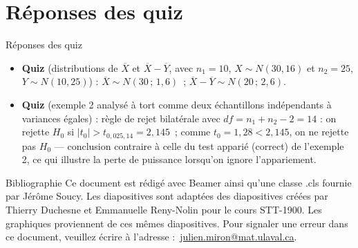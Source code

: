 \documentclass{BeamerTemplate}
\begin{document}
\section{Réponses des quiz}

\begin{frame}[t]{Réponses des quiz}
\footnotesize
\begin{itemize}
\item \textbf{Quiz} (distributions de $\overline X$ et $\overline X - \overline Y$, avec $n_1=10$,
$X\sim N(30,16)$ et $n_2=25$, $Y\sim N(10,25)$) : $\overline X \sim N(30\,;\,1{,}6)$~;
$\overline X - \overline Y \sim N(20\,;\,2{,}6)$.
\item \textbf{Quiz} (exemple 2 analysé à tort comme deux échantillons indépendants à variances
égales) : règle de rejet bilatérale avec $df=n_1+n_2-2=14$ : on rejette $H_0$ si $|t_0| >
t_{0{,}025,14}=2{,}145$~; comme $t_0=1{,}28 < 2{,}145$, on ne rejette pas $H_0$ — conclusion
contraire à celle du test apparié (correct) de l'exemple 2, ce qui illustre la perte de puissance
lorsqu'on ignore l'appariement.
\end{itemize}

\end{frame}

\begin{frame}{Bibliographie}
 	Ce document est rédigé avec Beamer ainsi qu'une classe .cls fournie par Jérôme Soucy. Les diapositives sont adaptées des diapositives créées par Thierry Duchesne et Emmanuelle Reny-Nolin pour le cours STT-1900. Les graphiques proviennent de ces mêmes diapositives.
 	\printbibliography
 	\vfill
 	\footnotesize Pour signaler une erreur dans ce document, veuillez écrire à l'adresse :~\href{mailto:julien.miron@mat.ulaval.ca}{julien.miron@mat.ulaval.ca}.
 \end{frame}
\end{document}
